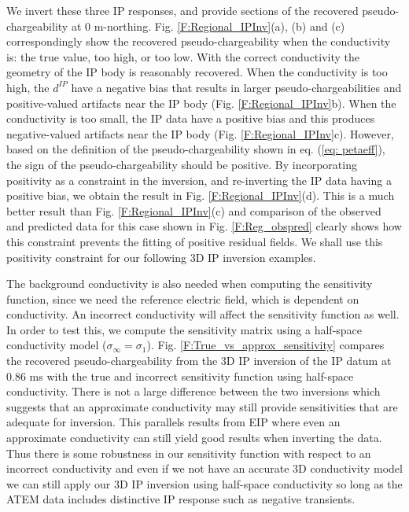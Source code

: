 \documentclass[extra,mreferee]{gji}
\newcommand{\siginf}{\sigma_\infty}
\newcommand{\dip}{d^{IP}}
\begin{document}
We invert these three IP responses, and provide sections of the recovered pseudo-chargeability at 0 m-northing. 
Fig. \ref{F:Regional_IPInv}(a), (b) and (c) correspondingly show the recovered pseudo-chargeability when the conductivity is: the true value, too high, or too low.  
With the correct conductivity the geometry of the IP body is reasonably recovered. 
When the conductivity is too high, the $\dip$ have a negative bias that results in larger pseudo-chargeabilities and positive-valued artifacts near the IP body (Fig. \ref{F:Regional_IPInv}b).  
When the conductivity is too small, the IP data have a positive bias and this produces  negative-valued artifacts near the IP body (Fig. \ref{F:Regional_IPInv}c). However, based on the  definition of the pseudo-chargeability shown in eq. (\ref{eq: petaeff}), the sign of the pseudo-chargeability should be positive. By incorporating positivity as a constraint in the inversion, and re-inverting the IP data having a positive bias, we obtain the result in  Fig. \ref{F:Regional_IPInv}(d).  This is a much better result than Fig. \ref{F:Regional_IPInv}(c)  and comparison of the observed and predicted data for this case shown in Fig. \ref{F:Reg_obspred} clearly shows how this constraint prevents the fitting of positive residual fields. We shall use this positivity  constraint for our following 3D IP inversion examples. 

The background conductivity is also needed when computing the sensitivity function, since we need the reference electric field, which is dependent on conductivity. 
An incorrect conductivity will affect the sensitivity function as well. 
In order to test this, we compute the sensitivity  matrix using a half-space conductivity model ($\siginf = \sigma_1$). 
Fig. \ref{F:True_vs_approx_sensitivity} compares the recovered pseudo-chargeability from the 3D IP inversion of the IP datum at 0.86 ms with the true and incorrect sensitivity function using half-space conductivity. 
There is not a large difference between the two inversions  which suggests that an approximate conductivity may still provide sensitivities that are adequate for inversion. This parallels results from EIP where even an approximate conductivity can still yield good results when inverting the data. Thus there is some robustness in our sensitivity function with respect to an  incorrect conductivity and even if we  not have an accurate 3D conductivity model we can still apply our 3D IP inversion using half-space conductivity so long as the ATEM data includes distinctive IP response such as negative transients.
\end{document}
